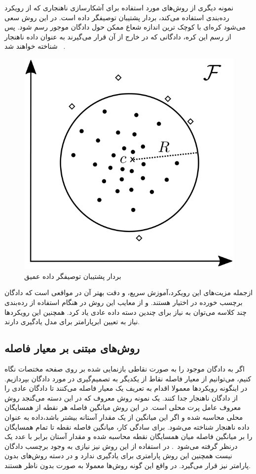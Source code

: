\documentclass[12pt,a4paper]{report}
\theoremstyle{definition}
\theoremstyle{definition}
\begin{document}
نمونه دیگری از روش‌های مورد استفاده برای آشکارسازی ناهنجاری که از رویکرد رده‌بندی استفاده می‌کند، بردار پشتیبان توصیفگر داده‌ است. در این روش سعی می‌شود کره‌ای با کوچک ترین اندازه شعاع ممکن حول دادگان موجور رسم شود. پس از رسم این کره، دادگانی که در خارج از آن قرار می‌گیرند به عنوان داده ناهنجار شناخته خواهند شد~\cite{pmlr-v80-ruff18a} .
\begin{figure}[!h]
	\begin{center}
		\includegraphics[width=0.5\linewidth]{./images/figures/svdd.png}
	\end{center}
	\caption{بردار پشتیبان توصیفگر داده عمیق~\cite{pmlr-v80-ruff18a}}
	\label{fig:deep-svdd}
	\centering
\end{figure}

ازجمله مزیت‌های این رویکرد،‌آموزش سریع، و دقت بهتر آن در مواقعی است که دادگان برچسب خورده در اختیار هستند. و از معایب این روش در هنگام استفاده از رده‌بندی چند کلاسه می‌توان به نیاز برای چندین دسته داده عادی یاد کرد. همچنین این رویکرد‌ها نیاز به تعیین ابرپارامتر برای مدل یادگیری دارند.

\subsection{روش‌های مبتنی بر معیار فاصله}
اگر به دادگان موجود را به صورت نقاطی بازنمایی شده بر روی صفحه مختصات نگاه کنیم،‌ می‌توانیم از معیار فاصله نقاط از یکدیگر به تصمیم‌گیری در مورد دادگان بپردازیم. در اینگونه رویکرد‌ها معمولا اقدام به تعریف یک معیار فاصله می‌کنند تا دادگان عادی را از دادگان ناهنجار جدا کنند. یک نمونه روش معروف که در این دسته می‌گنجد روش معروف عامل پرت محلی است. در این روش میانگین فاصله هر نقطه از همسایگان محلی محاسبه شده و اگر این میانگین از یک مقدار آستانه بیشتر باشد،‌داده به عنوان داده ناهنجار شناخته می‌شود. برای سادگی کار، میانگین فاصله نقطه تا تمام همسایگان را بر میانگین فاصله میان همسایگان نقطه محاسبه شده و مقدار آستان برابر با عدد یک درنظر گرفته می‌شود~\cite{10.1145/342009.335388}. در استفاده از این روش نیز نیازی به وجود برچسب دادگان نیست همچنین این روش پارامتری برای یادگیری ندارد و در دسته روش‌های بدون پارامتر نیز قرار می‌گیرد. در واقع این گونه روش‌ها معمولا به صورت بدون ناظر هستند.
\end{document}

